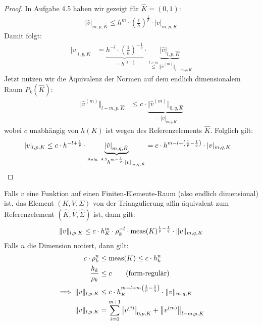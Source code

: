 \begin{proof}
	In Aufgabe 4.5 haben wir gezeigt für $\hat{K}=(0,1)$:
	\begin{align*}
		|\hat{v}|_{m,p,\hat{K}}\leq h^m\cdot\left(\frac{1}{h}\right)^{\frac{1}{p}}\cdot|v|_{m,p,K}
	\end{align*}
	Damit folgt:
	\begin{align*}
		|v|_{l,p,K}
		&=\underbrace{h^{-l}\cdot\left(\frac{1}{h}\right)^{-\frac{1}{p}}}_{=h^{-l+\frac{1}{p}}}\cdot\underbrace{|\hat{v}|_{l,p,\hat{K}}}_{\stackrel{l\geq m}{\leq}\Vert \hat{v}^{(m)}\Vert_{l-m,p,\hat{K}}}
	\end{align*}
	Jetzt nutzen wir die Äquivalenz der Normen auf dem endlich dimensionalem Raum $P_k(\hat{K})$:
	\begin{align*}
		\Vert \hat{v}^{(m)}\Vert_{l-m,p,\hat{K}}
		&\leq
		c\cdot\underbrace{\Vert\hat{v}^{(m)}\Vert_{0,q,\hat{K}}}_{=|\hat{v}|_{m,q,\hat{K}}}
	\end{align*}
	wobei $c$ unabhängig von $h(K)$ ist wegen des Referenzelements $\hat{K}$. Folglich gilt:
	\begin{align*}
		|v|_{l,p,K}
		&\leq
		c\cdot h^{-l+\frac{1}{p}}\cdot\underbrace{|\hat{v}|_{m,q,\hat{K}}}_{\stackrel{\text{Aufg. 4.5}}{=}h^{m-\frac{1}{q}}\cdot|v|_{m,q,\hat{K}}}
		=c\cdot h^{m-l+\left(\frac{1}{p}-\frac{1}{q}\right)}\cdot|v|_{m,q,K}
		\qedhere
	\end{align*}
\end{proof}

\begin{bemerkung}
	Falls $v$ eine Funktion auf einen Finiten-Elemente-Raum (also endlich dimensional) ist, das Element $(K,V,\Sigma)$ von der Triangulierung affin äquivalent zum Referenzelement $(\hat{K},\hat{V},\hat{\Sigma})$ ist, dann gilt:
	\begin{align*}
		\Vert v\Vert_{l,p,K}\leq c\cdot h_K^m\cdot\rho_k^{-l}\cdot\operatorname{meas}(K)^{\frac{1}{p}-\frac{1}{q}}\cdot\Vert v\Vert_{m,q,K}
	\end{align*}
	Falls $n$ die Dimension notiert, dann gilt:
	\begin{align*}
		c\cdot \rho_k^n&\leq\operatorname{meas}(K)\leq c\cdot h_k^n\\
		\frac{h_k}{\rho_k}&\leq c\qquad\text{(form-regulär)}\\
		\implies\Vert v\Vert_{l,p,K}&\leq c\cdot h_K^{m-l+n\cdot\left(\frac{1}{p}-\frac{1}{q}\right)}\cdot\Vert v\Vert_{m,q,K}\\
		\Vert v\Vert_{l,p,K}&=\sum\limits_{i=0}^{m+1}\big| v^{(i)}\big|_{0,p,K}+\big\Vert v^{(m)}\big\Vert_{l-m,p,K}
	\end{align*}
\end{bemerkung}

